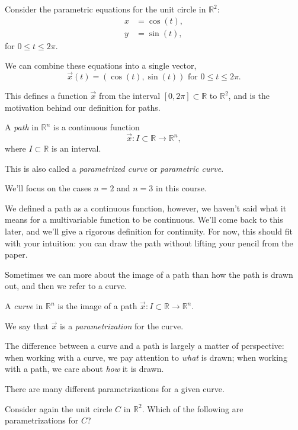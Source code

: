 \documentclass{ximera}
\begin{document}
Consider the parametric equations for the unit circle in $\mathbb{R}^2$:
\begin{align*}
x & = \cos(t),\\
y & = \sin(t),
\end{align*}
for $0\leq t \leq 2\pi$.

We can combine these equations into a single vector,
\[
\vec{x}(t) = (\cos(t), \sin(t))\textrm{ for }0\leq t\leq 2\pi.
\]

This defines a function $\vec{x}$ from the interval $[0,2\pi]\subset\mathbb{R}$ to $\mathbb{R}^2$, and is the motivation behind our definition for paths.

\begin{definition}
A \emph{path} in $\mathbb{R}^n$ is a continuous function
\[
\vec{x}:I\subset\mathbb{R}\rightarrow\mathbb{R}^n,
\]
where $I\subset\mathbb{R}$ is an interval.

This is also called a \emph{parametrized curve} or \emph{parametric curve}.
\end{definition}

We'll focus on the cases $n=2$ and $n=3$ in this course.

We defined a path as a continuous function, however, we haven't said what it means for a multivariable function to be continuous. We'll come back to this later, and we'll give a rigorous definition for continuity. For now, this should fit with your intuition: you can draw the path without lifting your pencil from the paper.

Sometimes we can more about the image of a path than how the path is drawn out, and then we refer to a curve.

\begin{definition}
A \emph{curve} in $\mathbb{R}^n$ is the image of a path $\vec{x}:I\subset\mathbb{R}\rightarrow\mathbb{R}^n$.

We say that $\vec{x}$ is a \emph{parametrization} for the curve.
\end{definition}

The difference between a curve and a path is largely a matter of perspective: when working with a curve, we pay attention to \emph{what} is drawn; when working with a path, we care about \emph{how} it is drawn.

\begin{example}
There are many different parametrizations for a given curve.

Consider again the unit circle $C$ in $\mathbb{R}^2$. Which of the following are parametrizations for $C$?
\begin{selectAll}
\end{selectAll}
\end{example}
\end{document}
